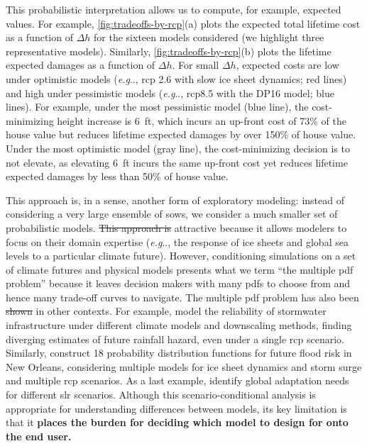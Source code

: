 \documentclass{agujournal2019}
\makeatletter
\DeclareRobustCommand\onedot{\futurelet\@let@token\@onedot}
\def\@onedot{\ifx\@let@token.\else.\null\fi\xspace}
\def\eg{\emph{e.g}\onedot} \def\Eg{\emph{E.g}\onedot}
\providecommand{\DIFadd}[1]{{\protect\color{blue}\uwave{#1}}} %
\providecommand{\DIFdel}[1]{{\protect\color{red}\sout{#1}}}                      %
\providecommand{\DIFaddbegin}{} %
\providecommand{\DIFaddend}{} %
\providecommand{\DIFdelbegin}{} %
\providecommand{\DIFdelend}{} %
\newcommand{\DIFscaledelfig}{0.5}
\newlength{\DIFdelgraphicswidth} %
\newlength{\DIFdelgraphicsheight} %
\newcommand{\DIFaddincludegraphics}[2][]{{\color{blue}\fbox{\DIFOincludegraphics[#1]{#2}}}} %
\newcommand{\DIFdelincludegraphics}[2][]{%
\sbox{\DIFdelgraphicsbox}{\DIFOincludegraphics[#1]{#2}}%
\settoboxwidth{\DIFdelgraphicswidth}{\DIFdelgraphicsbox} %
\settoboxtotalheight{\DIFdelgraphicsheight}{\DIFdelgraphicsbox} %
\scalebox{\DIFscaledelfig}{%
\parbox[b]{\DIFdelgraphicswidth}{\usebox{\DIFdelgraphicsbox}\\[-\baselineskip] \rule{\DIFdelgraphicswidth}{0em}}\llap{\resizebox{\DIFdelgraphicswidth}{\DIFdelgraphicsheight}{%
\setlength{\unitlength}{\DIFdelgraphicswidth}%
\begin{picture}(1,1)%
\thicklines\linethickness{2pt} %
{\color[rgb]{1,0,0}\put(0,0){\framebox(1,1){}}}%
{\color[rgb]{1,0,0}\put(0,0){\line( 1,1){1}}}%
{\color[rgb]{1,0,0}\put(0,1){\line(1,-1){1}}}%
\end{picture}%
}\hspace*{3pt}}} %
} %
\DeclareRobustCommand{\DIFaddbegin}{\DIFOaddbegin \let\includegraphics\DIFaddincludegraphics} %
\DeclareRobustCommand{\DIFaddend}{\DIFOaddend \let\includegraphics\DIFOincludegraphics} %
\DeclareRobustCommand{\DIFdelbegin}{\DIFOdelbegin \let\includegraphics\DIFdelincludegraphics} %
\DeclareRobustCommand{\DIFdelend}{\DIFOaddend \let\includegraphics\DIFOincludegraphics} %
\makeatother
\begin{document}
This probabilistic interpretation allows us to compute, for example, expected values.
For example, \cref{fig:tradeoffs-by-rcp}(a) plots the expected total lifetime cost as a function of $\Delta h$ for the sixteen models considered (we highlight three representative models).
Similarly, \cref{fig:tradeoffs-by-rcp}(b) plots the lifetime expected damages as a function of $\Delta h$.
For small $\Delta h$, expected costs are low under optimistic models (\eg, \gls{rcp} 2.6 with slow ice sheet dynamics; red lines) and high under pessimistic models (\eg, \gls{rcp}8.5 with the DP16 model; blue lines).
For example, under the most pessimistic model (blue line), the cost-minimizing height increase is \SI{6}{ft}, which incurs an up-front cost of 73\% of the house value but reduces lifetime expected damages by over 150\% of house value.
Under the most optimistic model (gray line), the cost-minimizing decision is to not elevate, as elevating \SI{6}{ft} incurs the same up-front cost yet reduces lifetime expected damages by less than 50\% of house value.

This approach is, in a sense, another form of exploratory modeling: instead of considering a very large ensemble of \glspl{sow}, we consider a much smaller set of probabilistic models.
\DIFdelbegin \DIFdel{This approach is }\DIFdelend \DIFaddbegin \DIFadd{Scenario-conditional analysis can be }\DIFaddend attractive because it allows modelers to focus on their domain expertise (\eg, the response of ice sheets and global sea levels to a particular climate future).
However, conditioning simulations on a set of climate futures and physical models presents what we term ``the multiple \gls{pdf} problem'' because it leaves decision makers with many \glspl{pdf} to choose from and hence many trade-off curves to navigate.
The multiple \gls{pdf} problem has also been \DIFdelbegin \DIFdel{shown }\DIFdelend \DIFaddbegin \DIFadd{discussed }\DIFaddend in other contexts.
For example,  model the reliability of stormwater infrastructure under different climate models and downscaling methods, finding diverging estimates of future rainfall hazard, even under a single \gls{rcp} scenario.
Similarly,  construct 18 probability distribution functions for future flood risk in New Orleans, considering multiple models for ice sheet dynamics and storm surge and multiple \gls{rcp} scenarios. As a last example,  identify global adaptation needs for different \gls{slr} scenarios.
Although this scenario-conditional analysis is appropriate for understanding differences between models, its key limitation is that it \textbf{places the burden for deciding which model to design for onto the end user.}
\end{document}
